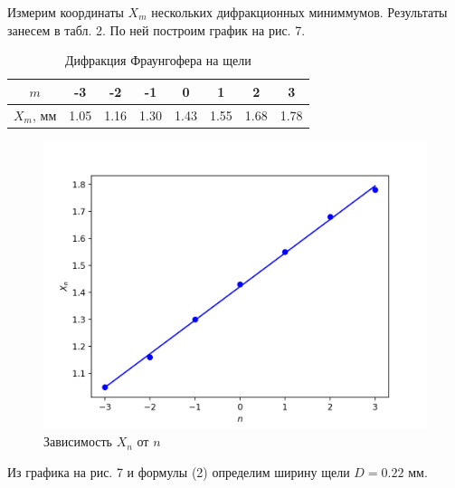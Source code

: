 \documentclass[a4paper,12pt]{article}
\begin{document}
\noindent
Измерим координаты $X_m$ нескольких дифракционных миниммумов. Результаты занесем в табл. 2. По ней построим график на рис. 7.

\begin{table}[H]
    \centering
    \caption{Дифракция Фраунгофера на щели}
    \begin{tabular}{|c|c|c|c|c|c|c|c|} \hline
        $m$ & -3 & -2 & -1 & 0 & 1 & 2 & 3 \\ \hline
        $X_m$, мм & 1.05 & 1.16 & 1.30 & 1.43 & 1.55 & 1.68 & 1.78 \\ \hline 
    \end{tabular}
\end{table}

\begin{figure}[H]
    \centering
    \includegraphics[scale=0.9]{2.png}
    \caption{Зависимость $X_n$ от $n$}
\end{figure}

\noindent
Из графика на рис. 7 и формулы (2) определим ширину щели $D = 0.22$ мм.
\end{document}
